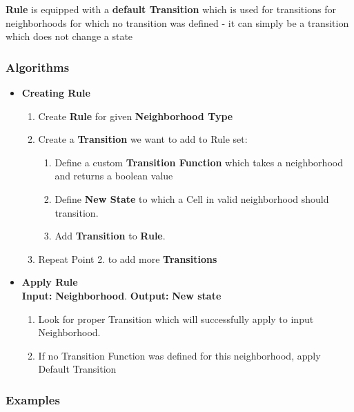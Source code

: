 \documentclass{article}
\begin{document}
{\bf Rule} is equipped with a {\bf default Transition} which is used for transitions
for neighborhoods for which no transition was defined - it can simply be a transition which
does not change a state

\subsubsection{Algorithms}
\begin{itemize}
\item {\bf Creating Rule}
	\begin{enumerate}
		\item Create {\bf Rule} for given {\bf Neighborhood Type}
		\item Create a {\bf Transition} we want to add to Rule set:
			\begin{enumerate}
				\item Define a custom {\bf Transition Function} which takes a 
				neighborhood and returns a boolean value			
				\item Define {\bf New State} to which a Cell in valid neighborhood should transition.
				\item Add {\bf Transition} to {\bf Rule}.
			\end{enumerate}
		\item Repeat Point 2. to add more {\bf Transitions}
	\end{enumerate}

\item {\bf Apply Rule}\\
	{\bf Input:} {\bf Neighborhood}. 
	{\bf Output:} {\bf New state}
	\begin{enumerate}
		\item Look for proper Transition which will successfully apply to input 
		Neighborhood.
		\item If no Transition Function was defined for this neighborhood, apply Default Transition
	\end{enumerate}

\end{itemize}

\subsubsection{Examples}
\end{document}
